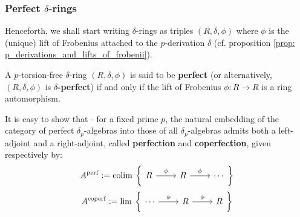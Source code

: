         \subsubsection{Perfect \texorpdfstring{$\delta$}{}-rings}
            \begin{convention}
                Henceforth, we shall start writing $\delta$-rings as triples $(R, \delta, \phi)$ where $\phi$ is the (unique) lift of Frobenius attached to the $p$-derivation $\delta$ (cf. proposition \ref{prop: p_derivations_and_lifts_of_frobenii}). 
            \end{convention}
            \begin{definition} \label{def: perfect_delta_rings}
                A $p$-torsion-free $\delta$-ring $(R, \delta, \phi)$ is said to be \textbf{perfect} (or alternatively, $(R, \delta, \phi)$ is \textbf{$\delta$-perfect}) if and only if the lift of Frobenius $\phi: R \to R$ is a ring automorphism. 
            \end{definition}
            \begin{remark} \label{remark: (co)perfection_of_delta_rings}
                It is easy to show that - for a fixed prime $p$, the natural embedding of the category of perfect $\delta_p$-algebras into those of all $\delta_p$-algebras admits both a left-adjoint and a right-adjoint, called \textbf{perfection} and \textbf{coperfection}, given respectively by:
                    $$
                        A^{\perf} :=
                        \colim
                        \left\{
                            \begin{tikzcd}
                                R & R & \cdots
                                \arrow["\phi", from=1-1, to=1-2]
                                \arrow["\phi", from=1-2, to=1-3]
                            \end{tikzcd}
                        \right\}
                    $$
                    $$
                        A^{\coperf} :=
                        \lim
                        \left\{
                            \begin{tikzcd}
                                \cdots & R & R
                                \arrow["\phi", from=1-2, to=1-3]
                                \arrow["\phi", from=1-1, to=1-2]
                            \end{tikzcd}
                        \right\}
                    $$
            \end{remark}
